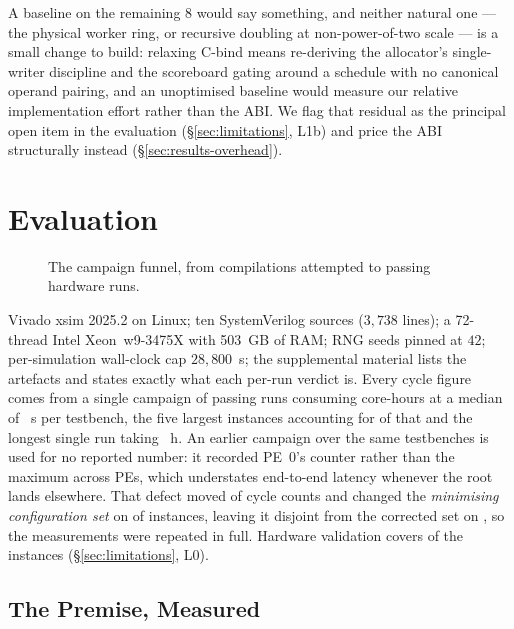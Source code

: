 \documentclass[journal,10pt]{IEEEtran}
\theoremstyle{plain}
\theoremstyle{definition}
\theoremstyle{remark}
\begin{document}
A baseline on the remaining $8$ would say something, and neither natural one --- the
physical worker ring, or recursive doubling at non-power-of-two scale --- is a
small change to build: relaxing \textsf{C-bind} means re-deriving the
allocator's single-writer discipline and the scoreboard gating around a
schedule with no canonical operand pairing, and an unoptimised baseline would
measure our relative implementation effort rather than the ABI. We flag that
residual as the principal open item in the evaluation
(\S\ref{sec:limitations}, L1b) and price the ABI structurally instead (\S\ref{sec:results-overhead}).


\section{Evaluation}\label{sec:results}

\begin{figure}[!t]\centering

\caption{The campaign funnel, from compilations attempted to passing hardware runs.}\label{fig:campaign}
\end{figure}


Vivado xsim 2025.2 on Linux; ten SystemVerilog sources ($3{,}738$ lines); a
72-thread Intel Xeon~w9-3475X with 503~GB of RAM; RNG seeds pinned at $42$;
per-simulation wall-clock cap $28{,}800$~s; the supplemental material lists
the artefacts and states exactly what each per-run verdict is. Every cycle figure comes from a
single campaign of \WallTBs{} passing runs consuming \WallTotalH{} core-hours
at a median of \WallMedianS{}~s per testbench, the five largest instances
accounting for \WallGiantShare{} of that and the longest single run taking
\WallMaxH{}~h. An earlier campaign over the same testbenches is used for no reported
number: it recorded PE~0's counter rather than the maximum across PEs, which
understates end-to-end latency whenever the root lands elsewhere. That defect
moved \ClsFragilePct{} of cycle counts and changed the \emph{minimising
configuration set} on \ClsFragileChanged{} of \TournNInst{} instances, leaving
it disjoint from the corrected set on \ClsFragileDisjoint{}, so the
measurements were repeated in full. Hardware validation covers \TournNInst{} of the
\SuiteSize{} instances (\S\ref{sec:limitations}, L0).

\subsection{The Premise, Measured}\label{sec:results-premise}
\end{document}
